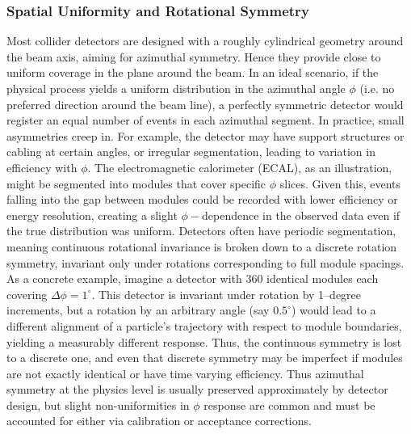         \subsubsection{Spatial Uniformity and Rotational Symmetry}
            Most collider detectors are designed with a roughly cylindrical geometry around the beam axis, aiming for azimuthal symmetry.
            Hence they provide close to uniform coverage in the plane around the beam.
            In an ideal scenario, if the physical process yields a uniform distribution in the azimuthal angle $\phi$ (i.e. no preferred direction around the beam line), a perfectly symmetric detector would register an equal number of events in each azimuthal segment.
            In practice, small asymmetries creep in.
            For example, the detector may have support structures or cabling at certain angles, or irregular segmentation, leading to variation in efficiency with $\phi$.
            The electromagnetic calorimeter (ECAL), as an illustration, might be segmented into modules that cover specific $\phi$ slices.
            Given this, events falling into the gap between modules could be recorded with lower efficiency or energy resolution, creating a slight $\phi-$dependence in the observed data even if the true distribution was uniform.
            Detectors often have periodic segmentation, meaning continuous rotational invariance is broken down to a discrete rotation symmetry, invariant only under rotations corresponding to full module spacings.
            As a concrete example, imagine a detector with 360 identical modules each covering $\Delta\phi = 1^\circ$.
            This detector is invariant under rotation by 1--degree increments, but a rotation by an arbitrary angle (say $0.5^\circ$) would lead to a different alignment of a particle’s trajectory with respect to module boundaries, yielding a measurably different response.
            Thus, the continuous symmetry is lost to a discrete one, and even that discrete symmetry may be imperfect if modules are not exactly identical or have time varying efficiency.
            Thus azimuthal symmetry at the physics level is usually preserved approximately by detector design, but slight non-uniformities in $\phi$ response are common and must be accounted for either via calibration or acceptance corrections.

